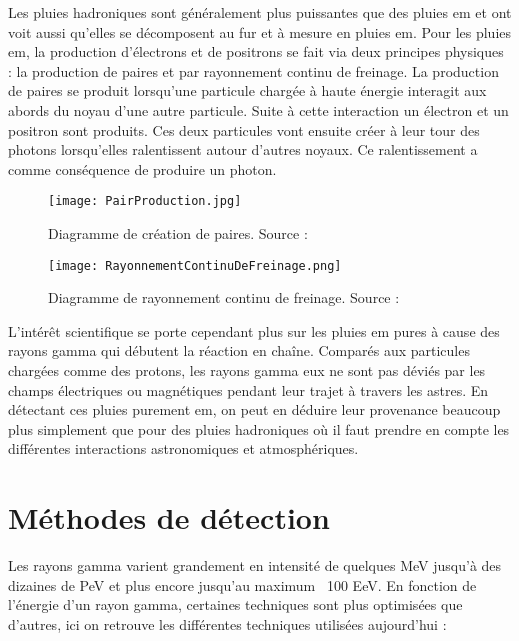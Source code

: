 Les pluies hadroniques sont généralement plus puissantes que des pluies \gls{em} et ont voit aussi qu'elles se décomposent au fur et à mesure en pluies \gls{em}.
Pour les pluies \gls{em}, la production d'électrons et de positrons se fait via deux principes physiques : la production de paires et par rayonnement continu de freinage.
La production de paires se produit lorsqu'une particule chargée à haute énergie interagit aux abords du noyau d'une autre particule.
Suite à cette interaction un électron et un positron sont produits. Ces deux particules vont ensuite créer à leur tour des photons 
lorsqu'elles ralentissent autour d'autres noyaux. Ce ralentissement a comme conséquence de produire un photon.

\begin{figure}[!tbp]
	\centering
	\begin{minipage}[b]{0.4\textwidth}
	  \texttt{[image: PairProduction.jpg]}
	  \caption[Création de paires]{Diagramme de création de paires. Source : \cite{PairProduction}}
	\end{minipage}
	\hfill
	\begin{minipage}[b]{0.4\textwidth}
	  \texttt{[image: RayonnementContinuDeFreinage.png]}
	  \caption[Rayonnement continu de freinage]{Diagramme de rayonnement continu de freinage. Source : \cite{Bremsstrahlung}}
	\end{minipage}
\end{figure}

L'intérêt scientifique se porte cependant plus sur les pluies \gls{em} pures à cause des rayons gamma qui débutent la réaction en chaîne.
Comparés aux particules chargées comme des protons, les rayons gamma eux ne sont pas déviés par les champs électriques ou magnétiques 
pendant leur trajet à travers les astres. En détectant ces pluies purement \gls{em}, on peut en déduire leur provenance beaucoup plus simplement 
que pour des pluies hadroniques où il faut prendre en compte les différentes interactions astronomiques et atmosphériques.


\section{Méthodes de détection}
Les rayons gamma varient grandement en intensité de quelques MeV jusqu'à des dizaines de PeV et plus encore jusqu'au maximum ~100 EeV. \cite{TjarkPHD}
En fonction de l'énergie d'un rayon gamma, certaines techniques sont plus optimisées que d'autres, ici on retrouve les différentes techniques utilisées aujourd'hui :

